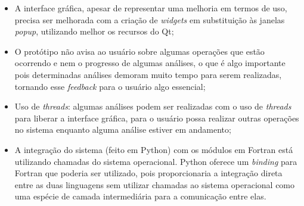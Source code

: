 \begin{itemize}
  \item{A interface gráfica, apesar de representar uma melhoria em termos de uso, precisa ser melhorada com a criação de \textit{widgets} em substituição
às janelas \textit{popup}, utilizando melhor os recursos do Qt;}
  \item{O protótipo não avisa ao usuário sobre algumas operações que estão ocorrendo e nem o progresso de algumas análises, o que é algo importante pois
determinadas análises demoram muito tempo para serem realizadas, tornando esse \textit{feedback} para o usuário algo essencial;}
  \item{Uso de \textit{threads}: algumas análises podem ser realizadas com o uso de \textit{threads} para liberar a interface gráfica, para o usuário possa
realizar outras operações no sistema enquanto alguma análise estiver em andamento;}
  \item{A integração do sistema (feito em Python) com os módulos em Fortran está utilizando chamadas do sistema operacional. Python oferece um
\textit{binding} para Fortran que poderia ser utilizado, pois proporcionaria a integração direta entre as duas linguagens sem utilizar chamadas ao
sistema operacional como uma espécie de camada intermediária para a comunicação entre elas.}
\end{itemize}

